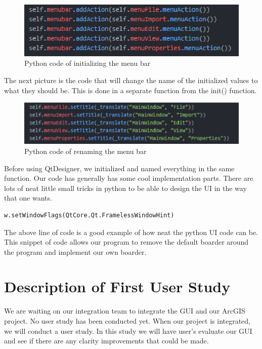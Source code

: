 \documentclass[onecolumn, draftclsnofoot,10pt, compsoc]{IEEEtran}
\begin{document}
\begin{figure}[H]
  \includegraphics[scale= 1]{intersting-code-1.eps}
  \caption{Python code of initializing the menu bar}
\end{figure}

The next picture is the code that will change the name of the initialized values to what they should be. This is done in a separate function from the init() function.

\begin{figure}[H]
  \includegraphics[scale= 1]{intersting-code-2.eps}
  \caption{Python code of renaming the menu bar}
\end{figure}

Before using QtDesigner, we initialized and named everything in the same function.
Our code has generally has some cool implementation parts. There are lots of neat little small tricks in python to be able to design the UI in the way that one wants.

\begin{verbatim}w.setWindowFlags(QtCore.Qt.FramelessWindowHint) 
\end{verbatim}
The above line of code is a good example of how neat the python UI code can be. This snippet of code allows our program to remove the default boarder around the program and implement our own boarder.


\section{Description of First User Study}
We are waiting on our integration team to integrate the GUI and our ArcGIS project. No user study has been conducted yet.
When our project is integrated, we will conduct a user study. In this study we will have user's evaluate our GUI and see if there are any clarity improvements that could be made. 

\renewcommand\refname{Bibliography}

\pagebreak
\nocite{*}%



\end{document}
